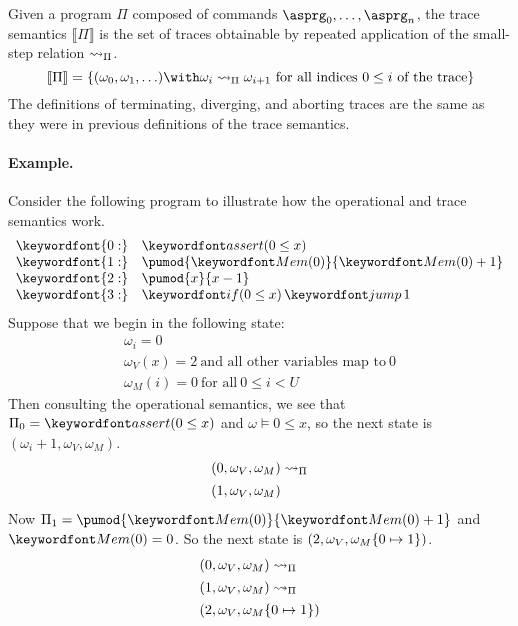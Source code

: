 \documentclass[11pt,twoside]{scrartcl}
\begin{document}
\begin{definition}
Given a program $\Pi$ composed of commands $\asprg_0,\ldots,\asprg_n$, the trace semantics $\llbracket\Pi\rrbracket$ is the set of traces obtainable by repeated application of the small-step relation $\rightsquigarrow_\Pi$.
\[
\llbracket\Pi\rrbracket =
\{
(\omega_0,\omega_1,\ldots) \with \omega_{i} \smallstep_\Pi \omega_{i+1}~\text{for all indices}~0 \le i~\text{of the trace}
\}
\]
The definitions of terminating, diverging, and aborting traces are the same as they were in previous definitions of the trace semantics.
\end{definition}

\paragraph{Example.}
Consider the following program to illustrate how the operational and trace semantics work.
\[
\begin{array}{ll}
\keywordfont{0:} & \passert{0 \le x} \\
\keywordfont{1:} & \pumod{\pderef{0}}{\pderef{0}+1} \\
\keywordfont{2:} & \pumod{x}{x-1} \\
\keywordfont{3:} & \pifjump{0 \le x}{1} \\
\end{array}
\]
Suppose that we begin in the following state:
\[
\begin{array}{l}
\omega_i = 0 \\
\omega_V(x) = 2~\text{and all other variables map to}~0 \\
\omega_M(i) = 0~\text{for all}~0 \le i < U
\end{array}
\]
Then consulting the operational semantics, we see that $\Pi_0 = \passert{0 \le x}$ and $\omega \models 0 \le x$, so the next state is $(\omega_i+1, \omega_V, \omega_M)$.
\[
\begin{array}{l}
(0, \omega_V, \omega_M) \rightsquigarrow_\Pi \\[1ex] 
(1, \omega_V, \omega_M)
\end{array}
\]
Now $\Pi_1 = \pumod{\pderef{0}}{\pderef{0}+1}$ and $\pderef{0} = 0$. So the next state is $(2, \omega_V, \omega_M\{0\mapsto1\})$.
\[
\begin{array}{l}
(0, \omega_V, \omega_M) \rightsquigarrow_\Pi \\[1ex] 
(1, \omega_V, \omega_M) \rightsquigarrow_\Pi \\[1ex]
(2, \omega_V, \omega_M\{0\mapsto1\})
\end{array}
\]
\end{document}
